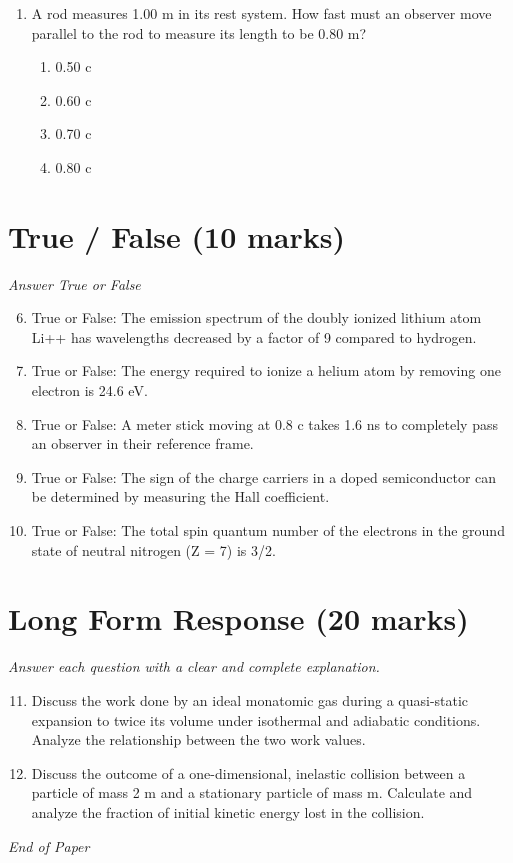 \documentclass[12pt]{article}
\begin{document}
\begin{enumerate}[label=\arabic*.]
\begin{enumerate}[label=(\alph*)]
    \item 5,000
    \item 10,000
\end{enumerate}
\item A rod measures 1.00 m in its rest system. How fast must an observer move parallel to the rod to measure its length to be 0.80 m?
\begin{enumerate}[label=(\alph*)]
    \item 0.50 c
    \item 0.60 c
    \item 0.70 c
    \item 0.80 c
\end{enumerate}
\end{enumerate}

\section*{True / False (10 marks)}
\textit{Answer True or False}
\begin{enumerate}[label=\arabic*.]
\setcounter{enumi}{5}
\item True or False: The emission spectrum of the doubly ionized lithium atom Li++ has wavelengths decreased by a factor of 9 compared to hydrogen.
\item True or False: The energy required to ionize a helium atom by removing one electron is 24.6 eV.
\item True or False: A meter stick moving at 0.8 c takes 1.6 ns to completely pass an observer in their reference frame.
\item True or False: The sign of the charge carriers in a doped semiconductor can be determined by measuring the Hall coefficient.
\item True or False: The total spin quantum number of the electrons in the ground state of neutral nitrogen (Z = 7) is 3/2.
\end{enumerate}

\section*{Long Form Response (20 marks)}
\textit{Answer each question with a clear and complete explanation.}
\begin{enumerate}[label=\arabic*.]
\setcounter{enumi}{10}
\item Discuss the work done by an ideal monatomic gas during a quasi-static expansion to twice its volume under isothermal and adiabatic conditions. Analyze the relationship between the two work values.
\item Discuss the outcome of a one-dimensional, inelastic collision between a particle of mass 2 m and a stationary particle of mass m. Calculate and analyze the fraction of initial kinetic energy lost in the collision.
\end{enumerate}

\vfill
\noindent\textit{End of Paper}
\end{document}
